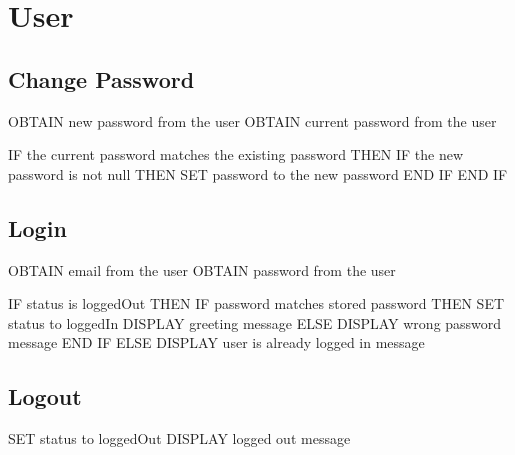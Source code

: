 \section{User}

\subsection{Change Password}
\begin{pc}
OBTAIN new password from the user
OBTAIN current password from the user

IF the current password matches the existing password THEN
	IF the new password is not null THEN
		SET password to the new password
	END IF
END IF
\end{pc}

\subsection{Login}
\begin{pc}
OBTAIN email from the user
OBTAIN password from the user

IF status is loggedOut THEN
	IF password matches stored password THEN
		SET status to loggedIn
		DISPLAY greeting message
	ELSE
		DISPLAY wrong password message
	END IF
ELSE
	DISPLAY user is already logged in message
\end{pc}

\subsection{Logout}
\begin{pc}
SET status to loggedOut
DISPLAY logged out message
\end{pc}
